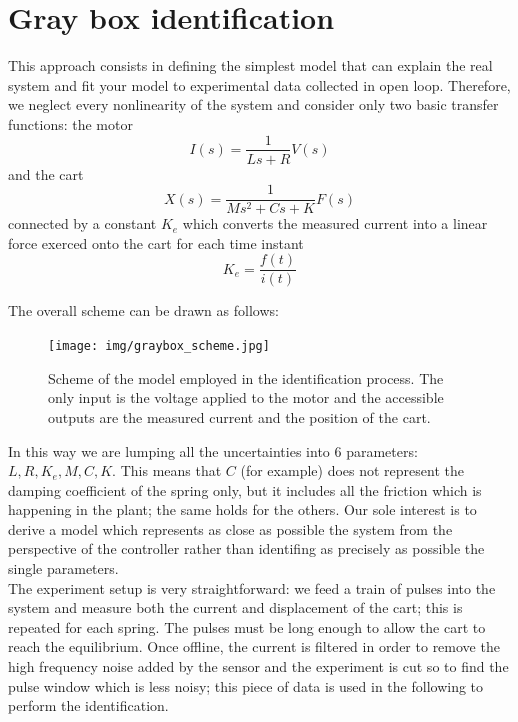 \chapter{Gray box identification}
This approach consists in defining the simplest model that can explain the real system and fit your model to experimental data collected in open loop. Therefore, we neglect every nonlinearity of the system and consider only two basic transfer functions: the motor
\begin{equation}
I(s) = \frac{1}{Ls+R} V(s)
\end{equation}
and the cart
\begin{equation}
X(s) = \frac{1}{Ms^2+Cs+K} F(s)
\end{equation}
connected by a constant $K_e$ which converts the measured current into a linear force exerced onto the cart for each time instant
\begin{equation}
K_e = \frac{f(t)}{i(t)}
\end{equation}

The overall scheme can be drawn as follows:
\begin{figure}
\texttt{[image: img/graybox\_scheme.jpg]}
\caption{Scheme of the model employed in the identification process. The only input is the voltage applied to the motor and the accessible outputs are the measured current and the position of the cart.}
\end{figure}

In this way we are lumping all the uncertainties into 6 parameters: $L, R, K_e, M, C, K$. This means that $C$ (for example) does not represent the damping coefficient of the spring only, but it includes all the friction which is happening in the plant; the same holds for the others. Our sole interest is to derive a model which represents as close as possible the system from the perspective of the controller rather than identifing as precisely as possible the single parameters.\\

The experiment setup is very straightforward: we feed a train of pulses into the system and measure both the current and displacement of the cart; this is repeated for each spring. The pulses must be long enough to allow the cart to reach the equilibrium. Once offline, the current is filtered in order to remove the high frequency noise added by the sensor and the experiment is cut so to find the pulse window which is less noisy; this piece of data is used in the following to perform the identification.\\


